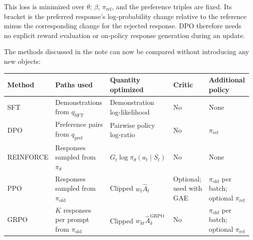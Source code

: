 \documentclass[11pt]{article}
\begin{document}
This loss is minimized over \(\theta\); \(\beta\), \(\pi_{\mathrm{ref}}\), and
the preference triples are fixed.  Its bracket is the preferred response's
log-probability change relative to the reference minus the corresponding
change for the rejected response.  DPO therefore needs no explicit reward
evaluation or on-policy response generation during an update.

The methods discussed in the note can now be compared without introducing
any new objects:

\begin{center}
\small
\begin{tabularx}{\textwidth}{@{}l Y Y Y Y@{}}
\toprule
Method & Paths used & Quantity optimized & Critic & Additional policy \\
\midrule
SFT
& Demonstrations from \(q_{\mathrm{SFT}}\)
& Demonstration log-likelihood
& No
& None \\
DPO
& Preference pairs from \(q_{\mathrm{pref}}\)
& Pairwise policy log-ratio
& No
& \(\pi_{\mathrm{ref}}\) \\
REINFORCE
& Responses sampled from \(\pi_\theta\)
& \(G_t\log\pi_\theta(a_t\mid S_t)\)
& No
& None \\
PPO
& Responses sampled from \(\pi_{\mathrm{old}}\)
& Clipped \(w_t\widehat A_t\)
& Optional; used with GAE
& \(\pi_{\mathrm{old}}\) per batch; optional \(\pi_{\mathrm{ref}}\) \\
GRPO
& \(K\) responses per prompt from \(\pi_{\mathrm{old}}\)
& Clipped \(w_{kt}\widehat A_k^{\mathrm{GRPO}}\)
& No
& \(\pi_{\mathrm{old}}\) per batch; optional \(\pi_{\mathrm{ref}}\) \\
\bottomrule
\end{tabularx}
\end{center}
\end{document}
